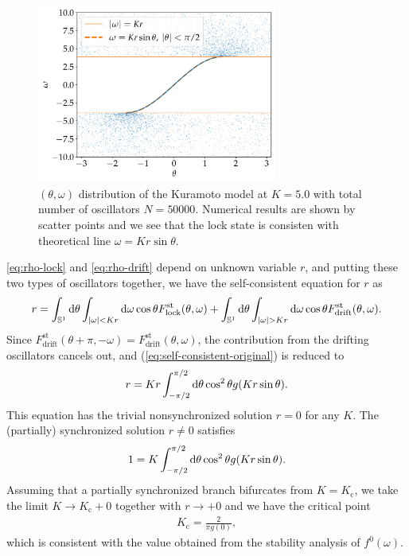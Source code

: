 \begin{figure}[htbp]
  \centering
  \includegraphics[width=0.7\textwidth]{figs/kuramoto_scatter.pdf}
  \caption{$(\theta,\omega)$ distribution of the Kuramoto model at $K=5.0$ with total number of oscillators $N=50000$.
  Numerical results are shown by scatter points and we see that the lock state is consisten with theoretical line $\omega=Kr\sin\theta$.}
  \label{fig:kuramoto-scatter}
\end{figure}

\eqref{eq:rho-lock} and \eqref{eq:rho-drift} depend on
unknown variable $r$,
and putting these two types of oscillators together,
we have the self-consistent equation for $r$ as
\begin{align}
  r=\int_{\mathbb{S}^{1}}\diff\theta\int_{|\omega|<Kr}\diff\omega\cos\theta F^{\mathrm{st}}_{\mathrm{lock}}(\theta,\omega)
  +\int_{\mathbb{S}^{1}}\diff\theta\int_{|\omega|>Kr}\diff\omega\cos\theta F^{\mathrm{st}}_{\mathrm{drift}}(\theta,\omega).
  \label{eq:self-consistent-original}
\end{align}
Since $F^{\mathrm{st}}_{\mathrm{drift}}(\theta+\pi,-\omega)=F^{\mathrm{st}}_{\mathrm{drift}}(\theta,\omega)$,
the contribution from the drifting oscillators cancels out,
and (\ref{eq:self-consistent-original}) is reduced to
\begin{align}
  r=Kr\int_{-\pi/2}^{\pi/2}\mathrm{d}\theta\cos^{2}\theta g(Kr\sin\theta).
  \label{eq:self-consistency}
\end{align}
This equation has the trivial nonsynchronized solution $r=0$ for any $K$.
The (partially) synchronized solution $r\ne 0$ satisfies
\begin{align}
  1=K\int_{-\pi/2}^{\pi/2}\mathrm{d}\theta\cos^{2}\theta g(Kr\sin\theta).
  \label{eq:self-consistency-divided}
\end{align}
Assuming that a partially synchronized branch bifurcates from $K=K_{\mathrm{c}}$,
we take the limit $K\to K_{\mathrm{c}}+0$ together with $r\to+0$
and we have the critical point
\begin{align}
  K_{\mathrm{c}}=\frac{2}{\pi g(0)},
  \label{eq:critical-point}
\end{align}
which is consistent with the value obtained from the stability analysis of $f^{0}(\omega)$.


